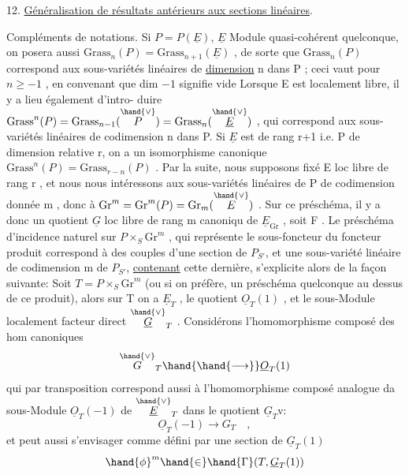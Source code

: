 
12. \uline{Généralisation de résultats antérieurs aux sections linéaires}.

Compléments de notations. Si $P = P(\underline{E})$, $\underline{E}$ Module quasi-cohérent
quelconque, on posera aussi $\mathrm{Grass}_n(P) = \mathrm{Grass}_{n+1}(\underline{E})$ , de sorte que
$\mathrm{Grass}_n(P)$ correspond aux sous-variétés linéaires de \uline{dimension} n dans
P ; ceci vaut pour $n \geq -1$ , en convenant que dim $-1$ signifie vide
Lorsque E est localement libre,  il y a lieu également d'intro-%
duire $\mathrm{Grass}^n(P) = \mathrm{Grass}_{n-1}(\overset{\hand{\vee}}{P}) = \mathrm{Grass}_n(\overset{\hand{\vee}}{\underline{E}})$ , qui correspond aux sous-%
variétés linéaires de codimension n dans P. Si $\underline{E}$ est de rang r+1 i.e.
P de dimension relative r, on a un isomorphisme canonique
$\mathrm{Grass}^n(P) = \mathrm{Grass}_{r-n}(P)$ . Par la suite, nous supposons fixé E loc
libre de rang r , et nous nous intéressons aux sous-variétés linéaires
de P de codimension donnée m , donc à $\mathrm{Gr}^m = \mathrm{Gr}^m(P) = \mathrm{Gr}_{m}(\overset{\hand{\vee}}{E})$ .
Sur ce préschéma, il y a donc un quotient $\underline{G}$ loc libre de rang m canoniqu
de $\underline{E}_{\mathrm{Gr}}$ , soit F .  Le préschéma d'incidence naturel
sur $P\times_S \mathrm{Gr}^m$ , qui représente le sous-foncteur du foncteur produit
correspond à des couples d'une section de $P_{S'}$, et une sous-variété
linéaire de codimension m de $P_{S'}$, \uline{contenant} cette dernière, s'explicite
alors de la façon suivante: Soit $T=P\times_S \mathrm{Gr}^m$ (ou si on préfère, un
préschéma quelconque au dessus de ce produit), alors sur  T on a
$\underline{E}_T$ , le quotient $\underline{O}_T(1)$ , et le sous-Module localement facteur direct
$\overset{\hand{\vee}}{\underline{G}}_T$ . Considérons l'homomorphisme composé des hom canoniques
\[ \overset{\hand{\vee}}{G}_T \hand{\hand{\longrightarrow}} \underline{O}_T(1) \]
qui par transposition correspond aussi à l'homomorphisme composé
analogue da sous-Module $\underline{O}_T(-1)$ de $\overset{\hand{\vee}}{\underline{E}}_T$ dans le quotient $\underline{G}_T\mathrm{v}$:
\[ \underline{O}_T(-1) \longrightarrow G_T \quad , \]
et peut aussi s'envisager comme défini par une section de $\underline{G}_T(1)$
\[ \hand{\phi}^m \hand{\in} \hand{\Gamma}(T, \underline{G}_T(1)) \]

